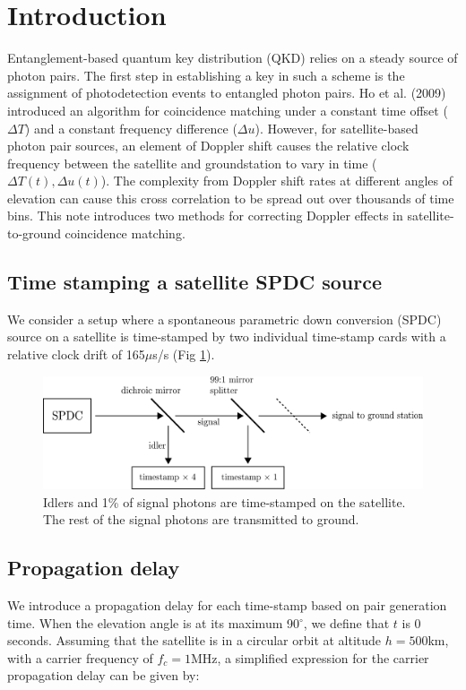 \section{Introduction}
Entanglement-based quantum key distribution (QKD) relies on a steady source of photon pairs. The first step in establishing a key in such a scheme is the assignment of photodetection events to entangled photon pairs. Ho et al. (2009) \cite{ho2009clock} introduced an algorithm for coincidence matching under a constant time offset ($\Delta T$) and a constant frequency difference ($\Delta u$). However, for satellite-based photon pair sources, an element of Doppler shift causes the relative clock frequency between the satellite and groundstation to vary in time ($\Delta T(t),\Delta u(t)$). The complexity from Doppler shift rates at different angles of elevation can cause this cross correlation to be spread out over thousands of time bins. This note introduces two methods for correcting Doppler effects in satellite-to-ground coincidence matching. 

\subsection{Time stamping a satellite SPDC source}

We consider a setup where a spontaneous parametric down conversion (SPDC) source on a satellite is time-stamped by two individual time-stamp cards with a relative clock drift of 165$\mu$s/s (Fig \ref{fig:spdc_source}).

\begin{figure}[ht!]
	\includegraphics[width=\linewidth]{assets/spdc_source}
	\caption{Idlers and 1\% of signal photons are time-stamped on the satellite. The rest of the signal photons are transmitted to ground.}
	\label{fig:spdc_source}
\end{figure}

\newpage

\subsection{Propagation delay}
We introduce a propagation delay for each time-stamp based on pair generation time. When the elevation angle is at its maximum 90$^\circ$, we define that $t$ is 0 seconds. Assuming that the satellite is in a circular orbit at altitude $h = 500$km, with a carrier frequency of $f_c = 1$MHz, a simplified expression for the carrier propagation delay can be given by:

